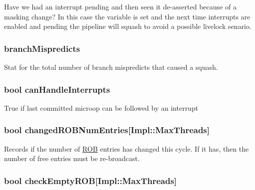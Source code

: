 \label{classDefaultCommit_a7c6eee41dc1f18f1f485518f8b066033}
Have we had an interrupt pending and then seen it de-\/asserted because of a masking change? In this case the variable is set and the next time interrupts are enabled and pending the pipeline will squash to avoid a possible livelock senario. \hypertarget{classDefaultCommit_a9cbfa1c154e785e3c45699b02a94053d}{
\subsubsection[{branchMispredicts}]{ {\bf branchMispredicts}}}
\label{classDefaultCommit_a9cbfa1c154e785e3c45699b02a94053d}
Stat for the total number of branch mispredicts that caused a squash. \hypertarget{classDefaultCommit_a893f45e65e8a47bca58661db7662cd9c}{
\subsubsection[{canHandleInterrupts}]{\setlength{\rightskip}{0pt plus 5cm}bool {\bf canHandleInterrupts}}}
\label{classDefaultCommit_a893f45e65e8a47bca58661db7662cd9c}
True if last committed microop can be followed by an interrupt \hypertarget{classDefaultCommit_a0d55e69b2ac22e8956d569bcf49e374b}{
\subsubsection[{changedROBNumEntries}]{\setlength{\rightskip}{0pt plus 5cm}bool {\bf changedROBNumEntries}\mbox{[}Impl::MaxThreads\mbox{]}}}
\label{classDefaultCommit_a0d55e69b2ac22e8956d569bcf49e374b}
Records if the number of \hyperlink{classROB}{ROB} entries has changed this cycle. If it has, then the number of free entries must be re-\/broadcast. \hypertarget{classDefaultCommit_aa2d2d9b2eec88d804e25d1cb37aa6083}{
\subsubsection[{checkEmptyROB}]{\setlength{\rightskip}{0pt plus 5cm}bool {\bf checkEmptyROB}\mbox{[}Impl::MaxThreads\mbox{]}}}
